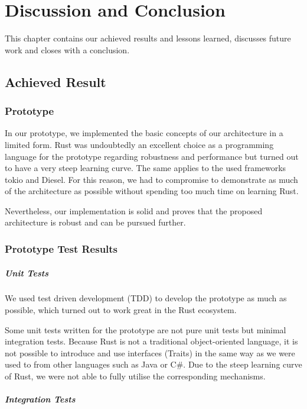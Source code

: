 \chapter{Discussion and Conclusion}
\label{sec:discussion-and-conclusion}
This chapter contains our achieved results and lessons learned, discusses future work and closes with a conclusion.

\section{Achieved Result}

\subsection{Prototype}

In our prototype, we implemented the basic concepts of our architecture in a limited form. Rust was undoubtedly an excellent choice as a programming language for the prototype regarding robustness and performance but turned out to have a very steep learning curve. The same applies to the used frameworks tokio and Diesel. For this reason, we had to compromise to demonstrate as much of the architecture as possible without spending too much time on learning Rust.

Nevertheless, our implementation is solid and proves that the proposed architecture is robust and can be pursued further.

\subsection{Prototype Test Results}

\paragraph{Unit Tests}
We used test driven development (TDD) to develop the prototype as much as possible, which turned out to work great in the Rust ecosystem.

Some unit tests written for the prototype are not pure unit tests but minimal integration tests. Because Rust is not a traditional object-oriented language, it is not possible to introduce and use interfaces (Traits) in the same way as we were used to from other languages such as Java or C\#. Due to the steep learning curve of Rust, we were not able to fully utilise the corresponding mechanisms.

\paragraph{Integration Tests}

